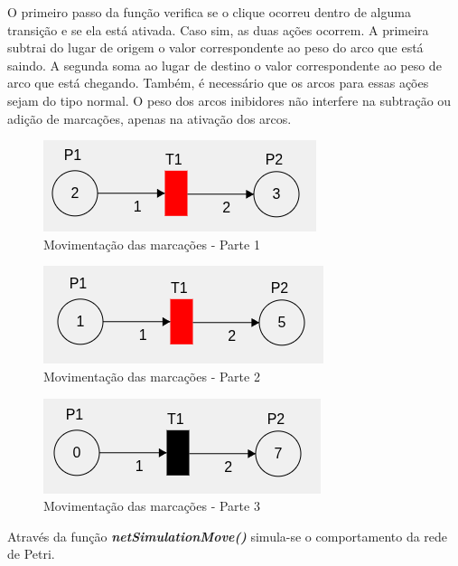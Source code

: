 \documentclass[
	12pt,				%
	openright,			%
	oneside,			%
	a4paper,			%
	english,			%
	brazil				%
	]{abntex2}
\theoremstyle{doispontos}
\begin{document}
O primeiro passo da função verifica se o clique ocorreu dentro de alguma transição e se ela está ativada. Caso sim, as duas ações ocorrem. A primeira subtrai do lugar de origem o valor correspondente ao peso do arco que está saindo. A segunda soma ao lugar de destino o valor correspondente ao peso de arco que está chegando. Também, é necessário que os arcos para essas ações sejam do tipo normal. O peso dos arcos inibidores não interfere na subtração ou adição de marcações, apenas na ativação dos arcos.

\begin{figure}[ht] 
	\centering
	\includegraphics[scale=0.8]{figuras/moveTokens1.png}
	\caption[Movimentando as marcações - Parte 1]{Movimentação das marcações - Parte 1}
	\label{fig:moveTokens1}
\end{figure}
\FloatBarrier

\begin{figure}[ht] 
	\centering
	\includegraphics[scale=0.8]{figuras/moveTokens2.png}
	\caption[Movimentando as marcações - Parte 2]{Movimentação das marcações - Parte 2}
	\label{fig:moveTokens2}
\end{figure}
\FloatBarrier

\begin{figure}[ht] 
	\centering
	\includegraphics[scale=0.8]{figuras/moveTokens3.png}
	\caption[Movimentando as marcações - Parte 3]{Movimentação das marcações - Parte 3}
	\label{fig:moveTokens3}
\end{figure}
\FloatBarrier

Através da função \textbf{\textit{netSimulationMove()}} simula-se o comportamento da rede de Petri.
\end{document}
